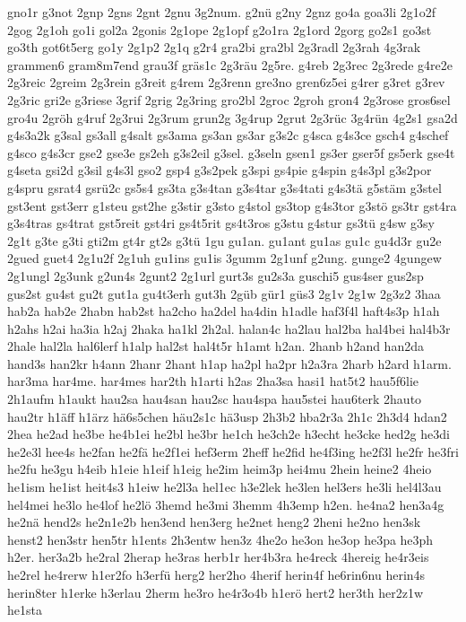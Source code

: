 {gno1r
g3not
2gnp
2gns
2gnt
2gnu
3g2num.
g2nü
g2ny
2gnz
go4a
goa3li
2g1o2f
2gog
2g1oh
go1i
gol2a
2gonis
2g1ope
2g1opf
g2o1ra
2g1ord
2gorg
go2s1
go3st
go3th
got6t5erg
go1y
2g1p2
2g1q
g2r4
gra2bi
gra2bl
2g3radl
2g3rah
4g3rak
grammen6
gram8m7end
grau3f
gräs1c
2g3räu
2g5re.
g4reb
2g3rec
2g3rede
g4re2e
2g3reic
2greim
2g3rein
g3reit
g4rem
2g3renn
gre3no
gren6z5ei
g4rer
g3ret
g3rev
2g3ric
gri2e
g3riese
3grif
2grig
2g3ring
gro2bl
2groc
2groh
gron4
2g3rose
gros6sel
gro4u
2gröh
g4ruf
2g3rui
2g3rum
grun2g
3g4rup
2grut
2g3rüc
3g4rün
4g2s1
gsa2d
g4s3a2k
g3sal
gs3all
g4salt
gs3ama
gs3an
gs3ar
g3s2c
g4sca
g4s3ce
gsch4
g4schef
g4sco
g4s3cr
gse2
gse3e
gs2eh
g3s2eil
g3sel.
g3seln
gsen1
gs3er
gser5f
gs5erk
gse4t
g4seta
gsi2d
g3sil
g4s3l
gso2
gsp4
g3s2pek
g3spi
gs4pie
g4spin
g4s3pl
g3s2por
g4spru
gsrat4
gsrü2c
gs5s4
gs3ta
g3s4tan
g3s4tar
g3s4tati
g4s3tä
g5stäm
g3stel
gst3ent
gst3err
g1steu
gst2he
g3stir
g3sto
g4stol
gs3top
g4s3tor
g3stö
gs3tr
gst4ra
g3s4tras
gs4trat
gst5reit
gst4ri
gs4t5rit
gs4t3ros
g3stu
g4stur
gs3tü
g4sw
g3sy
2g1t
g3te
g3ti
gti2m
gt4r
gt2s
g3tü
1gu
gu1an.
gu1ant
gu1as
gu1c
gu4d3r
gu2e
2gued
guet4
2g1u2f
2g1uh
gu1ins
gu1is
3gumm
2g1unf
g2ung.
gunge2
4gungew
2g1ungl
2g3unk
g2un4s
2gunt2
2g1url
gurt3s
gu2s3a
guschi5
gus4ser
gus2sp
gus2st
gu4st
gu2t
gut1a
gu4t3erh
gut3h
2güb
gür1
güs3
2g1v
2g1w
2g3z2
3haa
hab2a
hab2e
2habn
hab2st
ha2cho
ha2del
ha4din
h1adle
haf3f4l
haft4s3p
h1ah
h2ahs
h2ai
ha3ia
h2aj
2haka
ha1kl
2h2al.
halan4c
ha2lau
hal2ba
hal4bei
hal4b3r
2hale
hal2la
hal6lerf
h1alp
hal2st
hal4t5r
h1amt
h2an.
2hanb
h2and
han2da
hand3s
han2kr
h4ann
2hanr
2hant
h1ap
ha2pl
ha2pr
h2a3ra
2harb
h2ard
h1arm.
har3ma
har4me.
har4mes
har2th
h1arti
h2as
2ha3sa
hasi1
hat5t2
hau5f6lie
2h1aufm
h1aukt
hau2sa
hau4san
hau2sc
hau4spa
hau5stei
hau6terk
2hauto
hau2tr
h1äff
h1ärz
hä6s5chen
häu2s1c
hä3usp
2h3b2
hba2r3a
2h1c
2h3d4
hdan2
2hea
he2ad
he3be
he4b1ei
he2bl
he3br
he1ch
he3ch2e
h3echt
he3cke
hed2g
he3di
he2e3l
hee4s
he2fan
he2fä
he2f1ei
hef3erm
2heff
he2fid
he4f3ing
he2f3l
he2fr
he3fri
he2fu
he3gu
h4eib
h1eie
h1eif
h1eig
he2im
heim3p
hei4mu
2hein
heine2
4heio
he1ism
he1ist
heit4s3
h1eiw
he2l3a
hel1ec
h3e2lek
he3len
hel3ers
he3li
hel4l3au
hel4mei
he3lo
he4lof
he2lö
3hemd
he3mi
3hemm
4h3emp
h2en.
he4na2
hen3a4g
he2nä
hend2s
he2n1e2b
hen3end
hen3erg
he2net
heng2
2heni
he2no
hen3sk
henst2
hen3str
hen5tr
h1ents
2h3entw
hen3z
4he2o
he3on
he3op
he3pa
he3ph
h2er.
her3a2b
he2ral
2herap
he3ras
herb1r
her4b3ra
he4reck
4hereig
he4r3eis
he2rel
he4rerw
h1er2fo
h3erfü
herg2
her2ho
4herif
herin4f
he6rin6nu
herin4s
herin8ter
h1erke
h3erlau
2herm
he3ro
he4r3o4b
h1erö
hert2
her3th
her2z1w
he1sta
}

